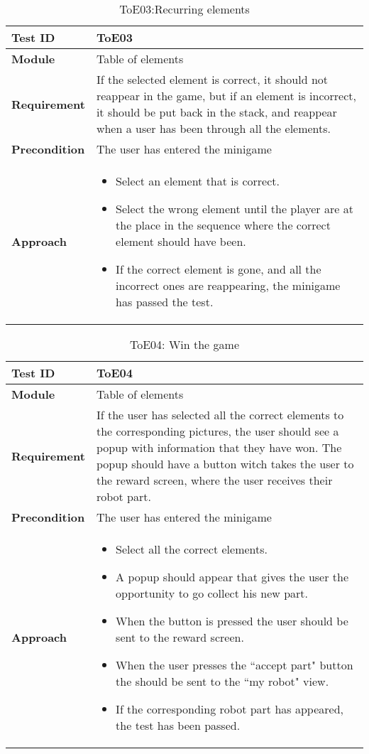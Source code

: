 \begin{table}[!h]
\caption{ToE03:Recurring elements}
\begin{tabular}{ |p{7cm}|p{7cm}| }
\hline
\textbf {Test ID} & {ToE03} \\ \hline
\textbf {Module} & {Table of elements} \\ \hline
\textbf {Requirement} & {If the selected element is correct, it should not reappear in the game, but if an element is incorrect, it should be put back in the stack, and reappear when a user has been through all the elements.} \\ \hline
\textbf {Precondition} & {The user has entered the minigame} \\ \hline
\textbf {Approach} & {\begin{itemize}
    \item Select an element that is correct.
    \item Select the wrong element until the player are at the place in the sequence where the correct element should have been.
    \item If the correct element is gone, and all the incorrect ones are reappearing, the minigame has passed the test.
\end{itemize}} \\ \hline
\end{tabular}
\end{table}

\begin{table}[!h]
\caption{ToE04: Win the game}
\begin{tabular}{ |p{7cm}|p{7cm}| }
\hline
\textbf {Test ID} & {ToE04} \\ \hline
\textbf {Module} & {Table of elements} \\ \hline
\textbf {Requirement} & {If the user has selected all the correct elements to the corresponding pictures, the user should see a popup with information that they have won. The popup should have a button witch takes the user to the reward screen, where the user receives their robot part.} \\ \hline
\textbf {Precondition} & {The user has entered the minigame} \\ \hline
\textbf {Approach} & {\begin{itemize}
    \item Select all the correct elements.
    \item A popup should appear that gives the user the opportunity to go collect his new part.
    \item When the button is pressed the user should be sent to the reward screen.
    \item When the user presses the ``accept part" button the should be sent to the ``my robot" view.
    \item If the corresponding robot part has appeared, the test has been passed.
\end{itemize}} \\ \hline
\end{tabular}
\end{table}
